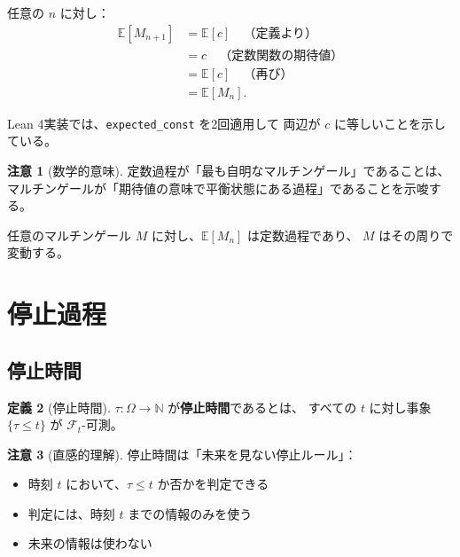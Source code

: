 \documentclass[a4paper,12pt]{ltjsarticle}
\theoremstyle{definition}
\newtheorem{definition}{定義}[section]
\newtheorem{remark}[definition]{注意}
\begin{document}
\begin{proofbox}[証明]
任意の $n$ に対し：
\begin{align*}
  \mathbb{E}[M_{n+1}]
  &= \mathbb{E}[c] \quad \text{（定義より）} \\
  &= c \quad \text{（定数関数の期待値）} \\
  &= \mathbb{E}[c] \quad \text{（再び）} \\
  &= \mathbb{E}[M_n].
\end{align*}

Lean 4実装では、\texttt{expected\_const} を2回適用して
両辺が $c$ に等しいことを示している。
\end{proofbox}

\begin{remark}[数学的意味]
定数過程が「最も自明なマルチンゲール」であることは、
マルチンゲールが「期待値の意味で平衡状態にある過程」であることを示唆する。

任意のマルチンゲール $M$ に対し、$\mathbb{E}[M_n]$ は定数過程であり、
$M$ はその周りで変動する。
\end{remark}

\section{停止過程}

\subsection{停止時間}

\begin{definition}[停止時間]
$\tau : \Omega \to \mathbb{N}$ が\textbf{停止時間}であるとは、
すべての $t$ に対し事象 $\{\tau \leq t\}$ が $\mathcal{F}_t$-可測。
\end{definition}

\begin{remark}[直感的理解]
停止時間は「未来を見ない停止ルール」：
\begin{itemize}
  \item 時刻 $t$ において、$\tau \leq t$ か否かを判定できる
  \item 判定には、時刻 $t$ までの情報のみを使う
  \item 未来の情報は使わない
\end{itemize}
\end{remark}
\end{document}
